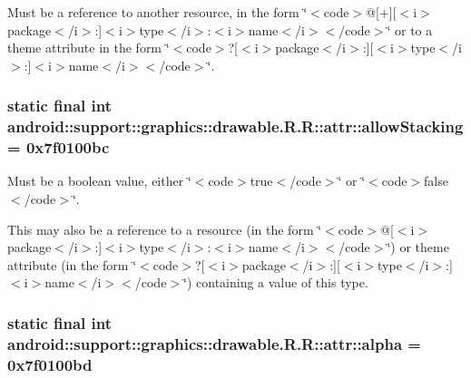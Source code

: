 Must be a reference to another resource, in the form \char`\"{}$<$code$>$@\mbox{[}+\mbox{]}\mbox{[}$<$i$>$package$<$/i$>$:\mbox{]}$<$i$>$type$<$/i$>$:$<$i$>$name$<$/i$>$$<$/code$>$\char`\"{} or to a theme attribute in the form \char`\"{}$<$code$>$?\mbox{[}$<$i$>$package$<$/i$>$:\mbox{]}\mbox{[}$<$i$>$type$<$/i$>$:\mbox{]}$<$i$>$name$<$/i$>$$<$/code$>$\char`\"{}. \hypertarget{classandroid_1_1support_1_1graphics_1_1drawable_1_1_r_1_1attr_2bf2d70654018a8a9e20243f09abe14c}{
\subsubsection[{allowStacking}]{\setlength{\rightskip}{0pt plus 5cm}static final int android::support::graphics::drawable.R.R::attr::allowStacking = 0x7f0100bc}}
\label{classandroid_1_1support_1_1graphics_1_1drawable_1_1_r_1_1attr_2bf2d70654018a8a9e20243f09abe14c}


Must be a boolean value, either \char`\"{}$<$code$>$true$<$/code$>$\char`\"{} or \char`\"{}$<$code$>$false$<$/code$>$\char`\"{}. 

This may also be a reference to a resource (in the form \char`\"{}$<$code$>$@\mbox{[}$<$i$>$package$<$/i$>$:\mbox{]}$<$i$>$type$<$/i$>$:$<$i$>$name$<$/i$>$$<$/code$>$\char`\"{}) or theme attribute (in the form \char`\"{}$<$code$>$?\mbox{[}$<$i$>$package$<$/i$>$:\mbox{]}\mbox{[}$<$i$>$type$<$/i$>$:\mbox{]}$<$i$>$name$<$/i$>$$<$/code$>$\char`\"{}) containing a value of this type. \hypertarget{classandroid_1_1support_1_1graphics_1_1drawable_1_1_r_1_1attr_447cc8ccbf7ec208b553db95726a8468}{
\subsubsection[{alpha}]{\setlength{\rightskip}{0pt plus 5cm}static final int android::support::graphics::drawable.R.R::attr::alpha = 0x7f0100bd}}
\label{classandroid_1_1support_1_1graphics_1_1drawable_1_1_r_1_1attr_447cc8ccbf7ec208b553db95726a8468}


